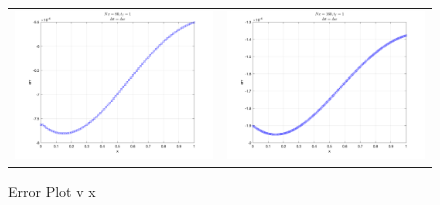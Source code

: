 \documentclass[11pt]{article}
\begin{document}
\begin{enumerate}
\begin{enumerate}
\begin{figure}[htp]
\begin{tabular}{cc}
      \includegraphics[width=3.3in]{ErrVx_5.png} & \includegraphics[width=3.3in]{ErrVx_6.png}
      \end{tabular}
      \caption{Error Plot v x}
      \label{fig:q1_2}
      \end{figure}
      

\end{enumerate}
\end{enumerate}
\end{document}
